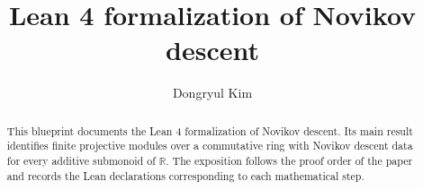 \documentclass[a4paper]{article}
\title{Lean 4 formalization of Novikov descent}
\author{Dongryul Kim}
\begin{document}
\maketitle
\begin{abstract}
  This blueprint documents the Lean 4 formalization of Novikov descent.  Its
  main result identifies finite projective modules over a commutative ring
  with Novikov descent data for every additive submonoid of $\mathbb{R}$.
  The exposition follows the proof order of the paper and records the Lean
  declarations corresponding to each mathematical step.
\end{abstract}
\tableofcontents
\clearpage

\end{document}
